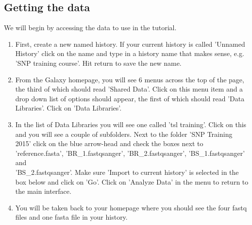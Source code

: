 \documentclass[12pt,a4paper]{article}
\begin{document}
\subsection{Getting the data}

We will begin by accessing the data to use in the tutorial.
\begin{enumerate}
	\item First, create a new named history. If your current
          history is called 'Unnamed History' click on the name and
          type in a history name that makes sense, e.g. 'SNP training
          course'. Hit return to save the new name.
	\item From the Galaxy homepage, you will see 6 menus across
          the top of the page, the third of which should read 'Shared
          Data'. Click on this menu item and a drop down list of
          options should appear, the first of which should read 'Data
          Libraries'. Click on 'Data Libraries'.
	\item In the list of Data Libraries you will see one called
          'tsl training'. Click on this and you will see a couple of
          subfolders. Next to the folder 'SNP Training 2015' click on the
          blue arrow-head and check the boxes next to
          'reference.fasta', 'BR\_1.fastqsanger',
          'BR\_2.fastqsanger', 'BS\_1.fastqsanger' and\\
          'BS\_2.fastqsanger'. Make sure 'Import to current
          history' is selected in the box below and click on
          'Go'. Click on 'Analyze Data' in the menu to return to the
          main interface.
	\item You will be taken back to your homepage where you should
          see the four fastq files and one fasta file in your history.
\end{enumerate}



\end{document}
